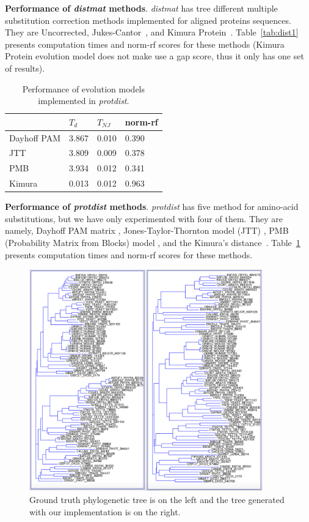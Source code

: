 \documentclass[11pt,letterpaper]{article}
\theoremstyle{definition}
\begin{document}
\textbf{Performance of \textit{distmat} methods}. \textit{distmat} has tree different multiple substitution correction methods implemented for aligned proteins sequences. They are Uncorrected, Jukes-Cantor~\cite{jukes1969evolution}, and Kimura Protein~\cite{kimura1980simple}. Table~\ref{tab:dist1} presents computation times and norm-rf scores for these methods (Kimura Protein evolution model does not make use a gap score, thus it only has one set of results).

\begin{table}[h]
\centering
	\begin{tabular}{l|lll}
	\hline
	&	$T_d$	& $T_{NJ}$	& norm-rf  \\
	\hline
	Dayhoff PAM	&	3.867	&	0.010	&	0.390	\\
	JTT			&	3.809	&	0.009	&	0.378	\\
	PMB			&	3.934	&	0.012	&	0.341	\\
	Kimura		&	0.013	&	0.012	&	0.963	\\
	\hline
	\end{tabular}
\caption{Performance of evolution models implemented in \textit{protdist}.}\label{tab:dist2}
\end{table}

\textbf{Performance of \textit{protdist} methods}. \textit{protdist} has five method for amino-acid substitutions, but we have only experimented with four of them. They are namely, Dayhoff PAM matrix \cite{kosiol2005different}, Jones-Taylor-Thornton model (JTT) \cite{jones1992rapid}, PMB (Probability Matrix from Blocks) model \cite{veerassamy2003transition}, and the Kimura's distance~\cite{kimura1983rare}. Table~\ref{tab:dist2} presents computation times and norm-rf scores for these methods.

\begin{figure}[t]
  \centering
  \includegraphics[width=0.9\textwidth]{gt-PMB.jpg}
  \caption{Ground truth phylogenetic tree is on the left and the tree generated with our implementation is on the right.}
  \label{fig:gt-PMB}
\end{figure}
\end{document}
